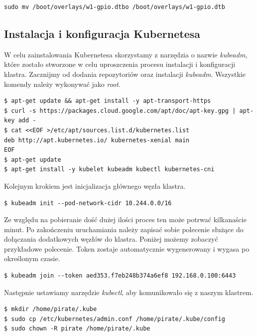 \documentclass[12pt]{report}
\let\Oldsubsection\subsection
\renewcommand{\subsection}{\FloatBarrier\Oldsubsection}
\begin{document}
{\begin{lstlisting}
sudo mv /boot/overlays/w1-gpio.dtbo	/boot/overlays/w1-gpio.dtb
\end{lstlisting}

\subsection{Instalacja i konfiguracja Kubernetesa} \label{subsect:kubernetes-install}
W celu zainstalowania Kubernetesa skorzystamy z narzędzia o nazwie \textit{kubeadm}, które zostało stworzone w celu uproszczenia procesu instalacji i konfiguracji klastra. Zacznijmy od dodania repozytoriów oraz instalacji \textit{kubeadm}. Wszystkie komendy należy wykonywać jako \textit{root}. \\

\begin{lstlisting}
$ apt-get update && apt-get install -y apt-transport-https
$ curl -s https://packages.cloud.google.com/apt/doc/apt-key.gpg | apt-key add -
$ cat <<EOF >/etc/apt/sources.list.d/kubernetes.list
deb http://apt.kubernetes.io/ kubernetes-xenial main
EOF
$ apt-get update
$ apt-get install -y kubelet kubeadm kubectl kubernetes-cni
\end{lstlisting}

\noindent Kolejnym krokiem jest inicjalizacja głównego węzła klastra. \\

\begin{lstlisting}
$ kubeadm init --pod-network-cidr 10.244.0.0/16
\end{lstlisting}

Ze względu na pobieranie dość dużej ilości proces ten może potrwać kilkanaście minut. Po zakończeniu uruchamiania należy zapisać sobie polecenie służące do dołączania dodatkowych węzłów do klastra. Poniżej możemy zobaczyć przykładowe polecenie. Token zostaje automatycznie wygenerowany i wygasa po określonym czasie.

\begin{lstlisting}
$ kubeadm join --token aed353.f7eb248b374a6ef8 192.168.0.100:6443
\end{lstlisting}

Następnie ustawiamy narzędzie \textit{kubectl}, aby komunikowało się z naszym klastrem.

\begin{lstlisting}
$ mkdir /home/pirate/.kube
$ sudo cp /etc/kubernetes/admin.conf /home/pirate/.kube/config
$ sudo chown -R pirate /home/pirate/.kube
\end{lstlisting}

}
\end{document}
